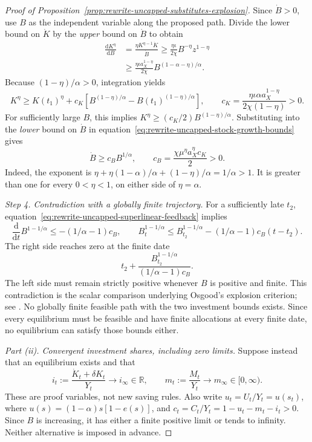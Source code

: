 \begin{proof}[Proof of Proposition~\ref{prop:rewrite-uncapped-substitutes-explosion}]
Since $\dot B>0$, use $B$ as the independent variable along the proposed
path. Divide the lower bound on $\dot K$ by the \emph{upper} bound on
$\dot B$ to obtain
\begin{align}
 \frac{\mathrm dK^\eta}{\mathrm dB}
 &=\frac{\eta K^{\eta-1}\dot K}{\dot B}
 \geq\frac{\eta\iota}{2\chi}B^{-\eta}z^{1-\eta}\nonumber\\
 &\geq\frac{\eta\iota a_X^{1-\eta}}{2\chi}
 B^{(1-\alpha-\eta)/\alpha}.
 \label{eq:rewrite-uncapped-capital-feedback}
\end{align}
Because $(1-\eta)/\alpha>0$, integration yields
\[
 K^\eta\geq K(t_1)^\eta+
 c_K\left[B^{(1-\eta)/\alpha}-B(t_1)^{(1-\eta)/\alpha}\right],
 \qquad
 c_K=\frac{\eta\iota\alpha a_X^{1-\eta}}{2\chi(1-\eta)}>0.
\]
For sufficiently large $B$, this implies
$K^\eta\geq(c_K/2)B^{(1-\eta)/\alpha}$. Substituting into the
\emph{lower} bound on $\dot B$ in
equation~\eqref{eq:rewrite-uncapped-stock-growth-bounds} gives
\begin{equation}
 \dot B\geq c_BB^{1/\alpha},\qquad
 c_B=\frac{\chi\mu^\eta a_X^\eta c_K}{2}>0.
 \label{eq:rewrite-uncapped-superlinear-feedback}
\end{equation}
Indeed, the exponent is
$\eta+\eta(1-\alpha)/\alpha+(1-\eta)/\alpha=1/\alpha>1$.
It is greater than one for every $0<\eta<1$, on either side of
$\eta=\alpha$.

\textit{Step 4. Contradiction with a globally finite trajectory.}
For a sufficiently late $t_2$, equation~\eqref{eq:rewrite-uncapped-superlinear-feedback}
implies
\[
 \frac{\mathrm d}{\mathrm dt}B^{1-1/\alpha}
 \leq-(1/\alpha-1)c_B,
 \qquad
 B_t^{1-1/\alpha}\leq
 B_{t_2}^{1-1/\alpha}-(1/\alpha-1)c_B(t-t_2).
\]
The right side reaches zero at the finite date
\[
 t_2+\frac{B_{t_2}^{1-1/\alpha}}{(1/\alpha-1)c_B}.
\]
The left side must remain strictly positive whenever $B$ is positive
and finite. This contradiction is the scalar comparison underlying
Osgood's explosion criterion; see
\citet[Lemma 2.2 and Theorem 3.1]{ceballosetal2011}.
No globally finite feasible path with the two investment bounds exists.
Since every equilibrium must be feasible and have finite allocations at
every finite date, no equilibrium can satisfy those bounds either.

\par\medskip\noindent\textit{Part (ii). Convergent investment shares, including zero limits.}
Suppose instead that an equilibrium exists and that
\[
 i_t:=\frac{\dot K_t+\delta K_t}{Y_t}\to i_\infty\in\mathbb R,
 \qquad m_t:=\frac{M_t}{Y_t}\to m_\infty\in[0,\infty).
\]
These are proof variables, not new saving rules. Also write
$u_t=U_t/Y_t=u(s_t)$, where $u(s)=(1-\alpha)s[1-e(s)]$, and
$c_t=C_t/Y_t=1-u_t-m_t-i_t>0$.
Since $B$ is increasing, it has either a finite positive limit or tends
to infinity. Neither alternative is imposed in advance.


\end{proof}
